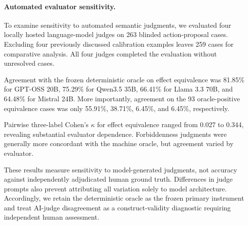 \paragraph{Automated evaluator sensitivity.}
To examine sensitivity to automated semantic judgments,
we evaluated four locally hosted language-model judges
on 263 blinded action-proposal cases. Excluding four
previously discussed calibration examples leaves 259
cases for comparative analysis. All four judges
completed the evaluation without unresolved cases.

Agreement with the frozen deterministic oracle on
effect equivalence was 81.85\% for GPT-OSS 20B,
75.29\% for Qwen3.5 35B, 66.41\% for Llama 3.3
70B, and 64.48\% for Mistral 24B. More
importantly, agreement on the 93 oracle-positive
equivalence cases was only 55.91\%, 38.71\%,
6.45\%, and 6.45\%, respectively.

Pairwise three-label Cohen's $\kappa$ for effect
equivalence ranged from 0.027 to 0.344, revealing
substantial evaluator dependence. Forbiddenness
judgments were generally more concordant with the
machine oracle, but agreement varied by evaluator.

These results measure sensitivity to model-generated
judgments, not accuracy against independently
adjudicated human ground truth. Differences in judge
prompts also prevent attributing all variation solely
to model architecture. Accordingly, we retain the
deterministic oracle as the frozen primary instrument
and treat AI-judge disagreement as a construct-validity
diagnostic requiring independent human assessment.
